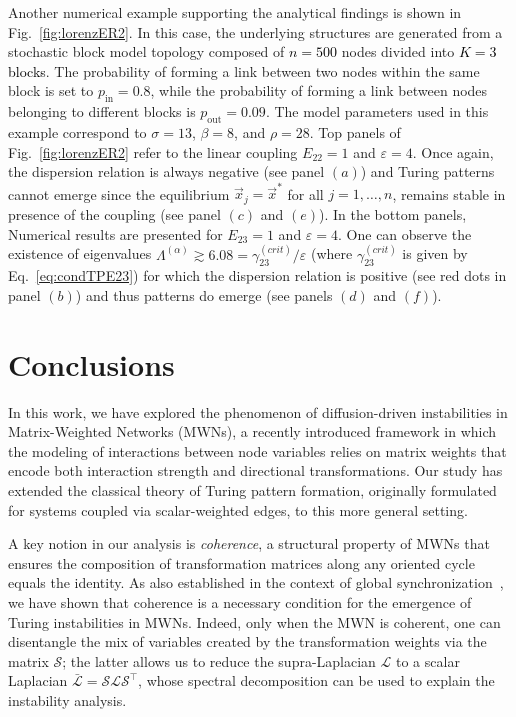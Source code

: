 \documentclass[aps,showpacs,preprintnumbers,amsmath,amssymb,twocolumn,superscriptaddress,floatfix,nofootinbib,10pt,pre]{revtex4-1}
\begin{document}
Another numerical example supporting the analytical findings is shown in Fig.~\ref{fig:lorenzER2}. 
In this case, the underlying structures are generated from a stochastic block model topology  
composed of \textcolor{black}{$n=500$} nodes divided into \textcolor{black}{$K=3$ blocks}. The probability of forming a link 
between two nodes within the same block is set to $p_{\text{in}} = 0.8$, while the 
probability of forming a link between nodes belonging to different blocks is 
$p_{\text{out}} = 0.09$. The model parameters used in this example correspond to $\sigma = 13$, $\beta = 8$, and $\rho = 28$. Top panels of Fig.~\ref{fig:lorenzER2} refer to the linear coupling $E_{22} = 1$ and $\varepsilon=4$. Once again, the dispersion relation is always negative (see panel $(a)$) and Turing patterns cannot emerge since the equilibrium $\vec{x}_j=\vec{x}^*$ for all $j=1,\dots,n$, remains stable in presence of the coupling (see panel $(c)$ and $(e)$). In the bottom panels, Numerical results are presented for $E_{23}=1$ and $\varepsilon=4$. One can observe the existence of eigenvalues $\Lambda^{(\alpha)}\gtrsim 6.08=\gamma^{(crit)}_{23}/\varepsilon$ (where $\gamma^{(crit)}_{23}$ is given by Eq.~\eqref{eq:condTPE23}) for which the dispersion relation is positive (see red dots in panel $(b)$) and thus patterns do emerge (see panels $(d)$ and $(f)$).

\section{Conclusions}
\label{sec:conc}

In this work, we have explored the phenomenon of diffusion-driven instabilities in Matrix-Weighted Networks (MWNs), a recently introduced framework in which the modeling of interactions between node variables relies on matrix weights that encode both interaction strength and directional transformations. Our study has extended the classical theory of Turing pattern formation, originally formulated for systems coupled via scalar-weighted edges, to this more general setting. 

A key notion in our analysis is \textit{coherence}, a structural property of MWNs that ensures the composition of transformation matrices along any oriented cycle equals the identity. As also established in the context of global synchronization~\cite{gallo2025global}, we have shown that coherence is a necessary condition for the emergence of Turing instabilities in MWNs. Indeed, only when the MWN is coherent, one can disentangle the mix of variables created by the transformation weights via the matrix $\mathcal{S}$; the latter allows us to reduce the supra-Laplacian $\mathcal{L}$ to a scalar Laplacian $\bar{\mathcal{L}} = \mathcal{S}\mathcal{L}\mathcal{S}^\top$, whose spectral decomposition can be used to explain the instability analysis. 
\end{document}
